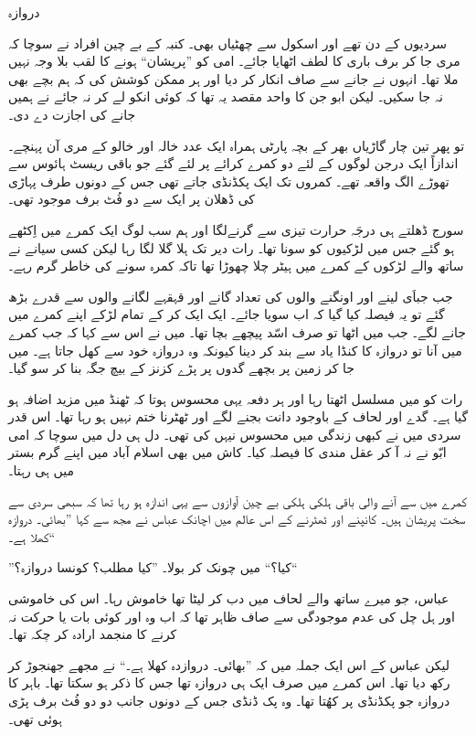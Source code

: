 \documentclass{article}
\begin{document}
\begin{center} \Large
   دروازہ
\end{center}

سردیوں کے دن تھے اور اسکول سے چھٹیاں بھی۔ کنبہ کے بے چین افراد نے سوچا کہ مری جا کر برف باری کا لطف اٹھایا جائے۔ امی کو ''پریشان`` ہونے کا لقب بلا وجہ نہیں ملا تھا۔ انہوں نے جانے سے صاف انکار کر دیا اور ہر ممکن کوشش کی کہ ہم بچے بھی نہ جا سکیں۔ لیکن ابو جن کا واحد مقصد یہ تھا کہ کوئی انکو لے کر نہ جائے نے ہمیں جانے کی اجازت دے دی۔

تو پھر تین چار گاڑیاں بھر کے بچہ پارٹی ہمراہ ایک عدد خالہ اور خالو کے مری آن پہنچے۔ اندازاً ایک درجن لوگوں کے لئے دو کمرے کرائے پر لئے گئے جو باقی ریسٹ ہائوس سے تھوڑے الگ واقعہ تھے۔ کمروں تک ایک پکڈنڈی جاتے تھی جس کے دونوں طرف پہاڑی کی ڈھلان پر ایک سے دو فُٹ برف موجود تھی۔

سورج ڈھلتے ہی درجَہ حرارت تیزی سے گرنےلگا اور ہم سب لوگ ایک کمرے میں اِکٹھے ہو گئے جس میں لڑکیوں کو سونا تھا۔ رات دیر تک ہلا گلا لگا رہا لیکن کسی سیانے نے ساتھ والے لڑکوں کے کمرے میں ہیٹر چلا چھوڑا تھا تاکہ کمرہ سونے کی خاطر گرم رہے۔

جب جباَی لینے اور اونگنے والوں کی تعداد گانے اور قہقہے لگانے والوں سے قدرے بڑھ گئے تو یہ فیصلہ کیا گیا کہ اب سویا جائے۔ ایک ایک کر کے تمام لڑکے اپنے کمرے میں جانے لگے۔ جب میں اٹھا تو صرف اسّد پیچھے بچا تھا۔ میں نے اس سے کہا کہ جب کمرے میں آنا تو دروازہ کا کنڈا یاد سے بند کر دینا کیونکہ وہ دروازہ خود سے کھل جاتا ہے۔ میں جا کر زمین پر بچھے گدوں پر پڑے کزنز کے بیچ جگہ بنا کر سو گیا۔

رات کو میں مسلسل اٹھتا رہا اور ہر دفعہ یہی محسوس ہوتا کہ ٹھنڈ میں مزید اضافہ ہو گیا ہے۔ گدے اور لحاف کے باوجود دانت بجنے لگے اور ٹھٹرنا ختم نہیں ہو رہا تھا۔ اس قدر سردی میں نے کبھی زندگی میں محسوس نیہں کی تھی۔ دل ہی دل میں سوچا کہ امی ابّو نے نہ آ کر عقل مندی کا فیصلہ کیا۔ کاش میں بھی اسلام آباد میں اپنے گرم بستر میں ہی رہتا۔

کمرے میں سے آنے والی باقی ہلکی ہلکی بے چین آوازوں سے یہی اندازہ ہو رہا تھا کہ سبھی سردی سے سخت پریشان ہیں۔ کانپنے اور ٹھٹرنے کے اس عالم میں اچانک عباس نے مجھ سے کہا ''بھائی۔ دروازہ کھلا ہے۔``

''کیا؟`` میں چونک کر بولا۔ ''کیا مطلب؟ کونسا دروازہ؟``

عباس، جو میرے ساتھ والے لحاف میں دب کر لیٹا تھا خاموش رہا۔ اس کی خاموشی اور ہل چل کی عدم موجودگی سے صاف ظاہر تھا کہ اب وہ اور کوئی بات یا حرکت نہ کرنے کا منجمد ارادہ کر چکہ تھا۔
 
لیکن عباس کے اس ایک جملہ میں کہ ''بھائی۔ دروازدہ کھلا ہے۔`` نے مجھے جھنجوڑ کر رکھ دیا تھا۔ اس کمرے میں صرف ایک ہی دروازہ تھا جس کا ذکر ہو سکتا تھا۔ باہر کا دروازہ جو پکڈنڈی پر کھُتا تھا۔ وہ پک ڈنڈی جس کے دونوں جانب دو دو فُٹ برف پڑی ہوئی تھی۔
\end{document}
